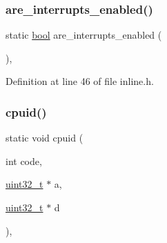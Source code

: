 \subsubsection{\texorpdfstring{are\+\_\+interrupts\+\_\+enabled()}{are\_interrupts\_enabled()}}
{\footnotesize\ttfamily static \hyperlink{a00092_af6a258d8f3ee5206d682d799316314b1_af6a258d8f3ee5206d682d799316314b1}{bool} are\+\_\+interrupts\+\_\+enabled (\begin{DoxyParamCaption}{ }\end{DoxyParamCaption})\hspace{0.3cm}{\ttfamily [inline]}, {\ttfamily [static]}}



Definition at line 46 of file inline.\+h.


\mbox{\label{a00104_adacb2a50c30267ac5314bfcb92ac1d85_adacb2a50c30267ac5314bfcb92ac1d85}} 
\subsubsection{\texorpdfstring{cpuid()}{cpuid()}}
{\footnotesize\ttfamily static void cpuid (\begin{DoxyParamCaption}\item[{int}]{code,  }\item[{\hyperlink{a00092_a435d1572bf3f880d55459d9805097f62_a435d1572bf3f880d55459d9805097f62}{uint32\+\_\+t} $\ast$}]{a,  }\item[{\hyperlink{a00092_a435d1572bf3f880d55459d9805097f62_a435d1572bf3f880d55459d9805097f62}{uint32\+\_\+t} $\ast$}]{d }\end{DoxyParamCaption})\hspace{0.3cm}{\ttfamily [inline]}, {\ttfamily [static]}}



